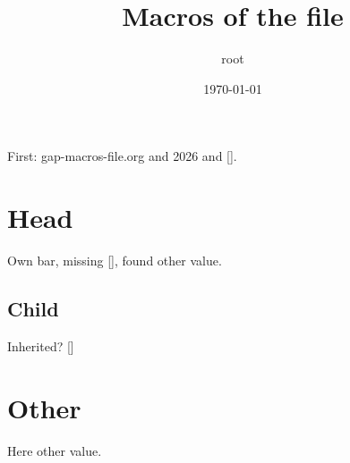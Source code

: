 \documentclass[11pt]{article}
\author{root}
\date{\today}
\title{Macros of the file}
\begin{document}
\maketitle
First: gap-macros-file.org and 2026 and [].
\section{Head}
\label{sec:orgb5ecd14}
Own bar, missing [], found other value.
\subsection{Child}
\label{sec:org8fcac1d}
Inherited? []
\section{Other}
\label{sec:org86fdf77}
Here other value.
\end{document}
